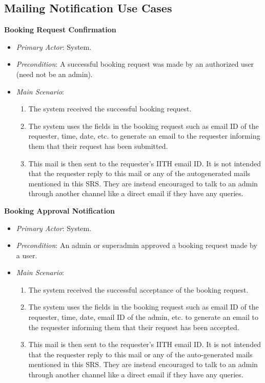 \documentclass{article}
\begin{document}
\subsection{Mailing Notification Use Cases}
\textbf{Booking Request Confirmation}
\label{ucbookingrequestconfirmation}
\begin{itemize}
    \item \textit{Primary Actor}: System.
    \item \textit{Precondition}: A successful booking request was made by an authorized user (need not be an admin).
    \item \textit{Main Scenario}:
    \begin{enumerate}
        \item The system received the successful booking request.
        \item The system uses the fields in the booking request such as email ID of the requester, time, date, etc. to generate an email to the requester informing them that their request has been submitted. 
        \item This mail is then sent to the requester's IITH email ID. It is not intended that the requester reply to this mail or any of the autogenerated mails mentioned in this SRS. They are instead encouraged to talk to an admin through another channel like a direct email if they have any queries. 
    \end{enumerate} 
\end{itemize}
\textbf{Booking Approval Notification}
\label{ucbookingapprovalnotification}
\begin{itemize}
    \item \textit{Primary Actor}: System.
    \item \textit{Precondition}: An admin or superadmin approved a booking request made by a user. 
    \item \textit{Main Scenario}:
    \begin{enumerate}
        \item The system received the successful acceptance of the booking request. 
        \item The system uses the fields in the booking request such as email ID of the requester, time, date, email ID of the admin, etc. to generate an email to the requester informing them that their request has been accepted. 
        \item This mail is then sent to the requester's IITH email ID. It is not intended that the requester reply to this mail or any of the auto-generated mails mentioned in this SRS. They are instead encouraged to talk to an admin through another channel like a direct email if they have any queries.
    \end{enumerate} 
\end{itemize}
\end{document}
